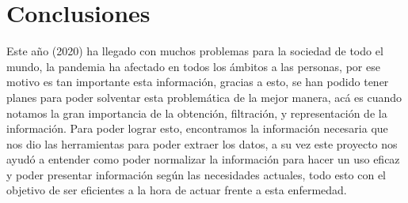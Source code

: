 \documentclass[conference,compsoc,onecolumn]{IEEEtran}
\begin{document}
\section{Conclusiones}
\label{sec:conclusions}
Este año (2020) ha llegado con muchos problemas para la sociedad de todo el mundo, la pandemia ha afectado en todos los ámbitos a las personas, por ese motivo es tan importante esta información, gracias a esto, se han podido tener planes para poder solventar esta problemática de la mejor manera, acá es cuando notamos la gran importancia de la obtención, filtración, y representación de la información. Para poder lograr esto, encontramos la información necesaria que nos dio las herramientas para poder extraer los datos, a su vez este proyecto nos ayudó a entender como poder normalizar la información para hacer un uso eficaz y poder presentar información según las necesidades actuales, todo esto con el objetivo de ser eficientes a la hora de actuar frente a esta enfermedad.


\nocite{*}

\label{sec:biblio}
 





\end{document}

